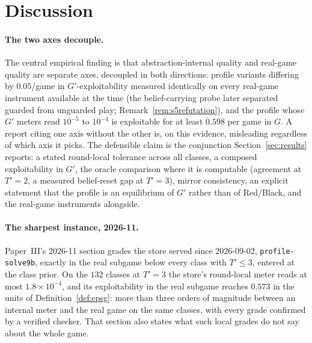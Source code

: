 \documentclass[11pt]{article}
\theoremstyle{plain}
\theoremstyle{definition}
\theoremstyle{remark}
\newcommand{\code}[1]{\texttt{\small #1}}
\newcommand{\game}{\ensuremath{G}}
\newcommand{\gp}{\ensuremath{G'}}
\begin{document}
\section{Discussion}\label{sec:discussion}

\paragraph{The two axes decouple.} The central empirical finding is that
abstraction-internal quality and real-game quality are separate axes, decoupled
in both directions: profile variants differing by $0.05$/game in
$\gp$-exploitability measured identically on every real-game instrument
available at the time (the belief-carrying probe later separated guarded
from unguarded play; Remark~\ref{rem:s5refutation}), and the
profile whose $\gp$ meters read $10^{-5}$ to $10^{-4}$ is exploitable for at
least $0.598$ per game in $\game$. A report citing one axis without the other
is, on this evidence, misleading regardless of which axis it picks. The
defensible claim is the conjunction Section~\ref{sec:results} reports: a stated
round-local tolerance across all classes, a composed exploitability in $\gp$,
the oracle comparison where it is computable (agreement at $T'=2$, a measured
belief-reset gap at $T'=3$), mirror consistency, an explicit statement
that the profile is an equilibrium of $\gp$ rather than of Red/Black, and the
real-game instruments alongside.

\paragraph{The sharpest instance, 2026-11.} Paper~III's 2026-11 section
grades the store served since 2026-09-02, \code{profile-solve9b}, exactly
in the real subgame below every class with $T'\le3$, entered at the class
prior. On the $132$ classes at $T'=3$ the store's round-local meter
reads at most $1.8\times10^{-4}$, and its exploitability in the real
subgame reaches $0.573$ in the units of Definition~\ref{def:epsg}: more
than three orders of magnitude between an internal meter and the real
game on the same classes, with every grade confirmed by a verified
checker. That section also states what such local grades do not say
about the whole game.
\end{document}
